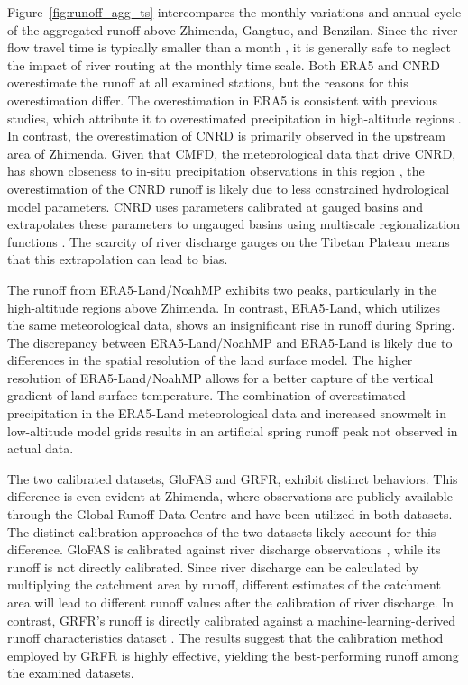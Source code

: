 \documentclass[water,article,submit,pdftex,moreauthors]{Definitions/mdpi}
\begin{document}
Figure~\ref{fig:runoff_agg_ts} intercompares the monthly variations and annual cycle of the aggregated runoff above Zhimenda, Gangtuo, and Benzilan. Since the river flow travel time is typically smaller than a month \citep{allen2018GRL}, it is generally safe to neglect the impact of river routing at the monthly time scale. Both ERA5 and CNRD overestimate the runoff at all examined stations, but the reasons for this overestimation differ. The overestimation in ERA5 is consistent with previous studies, which attribute it to overestimated precipitation in high-altitude regions \citep{bian2019JHM, bian2020JGRA, sun2021ERL, wang2024RS}. In contrast, the overestimation of CNRD is primarily observed in the upstream area of Zhimenda. Given that CMFD, the meteorological data that drive CNRD, has shown closeness to in-situ precipitation observations in this region \citep{wang2024RS}, the overestimation of the CNRD runoff is likely due to less constrained hydrological model parameters. CNRD uses parameters calibrated at gauged basins and extrapolates these parameters to ungauged basins using multiscale regionalization functions \citep{gou2021BAMS, miao2022CSB}. The scarcity of river discharge gauges on the Tibetan Plateau means that this extrapolation can lead to bias.

The runoff from ERA5-Land/NoahMP exhibits two peaks, particularly in the high-altitude regions above Zhimenda. In contrast, ERA5-Land, which utilizes the same meteorological data, shows an insignificant rise in runoff during Spring. The discrepancy between ERA5-Land/NoahMP and ERA5-Land is likely due to differences in the spatial resolution of the land surface model. The higher resolution of ERA5-Land/NoahMP allows for a better capture of the vertical gradient of land surface temperature. The combination of overestimated precipitation in the ERA5-Land meteorological data and increased snowmelt in low-altitude model grids \citep{barnhart2024WRR} results in an artificial spring runoff peak not observed in actual data.

The two calibrated datasets, GloFAS and GRFR, exhibit distinct behaviors. This difference is even evident at Zhimenda, where observations are publicly available through the Global Runoff Data Centre and have been utilized in both datasets. The distinct calibration approaches of the two datasets likely account for this difference. GloFAS is calibrated against river discharge observations \citep{hirpa2018JH}, while its runoff is not directly calibrated. Since river discharge can be calculated by multiplying the catchment area by runoff, different estimates of the catchment area will lead to different runoff values after the calibration of river discharge. In contrast, GRFR's runoff is directly calibrated against a machine-learning-derived runoff characteristics dataset \citep{yang2019WRR}. The results suggest that the calibration method employed by GRFR is highly effective, yielding the best-performing runoff among the examined datasets.
\end{document}
